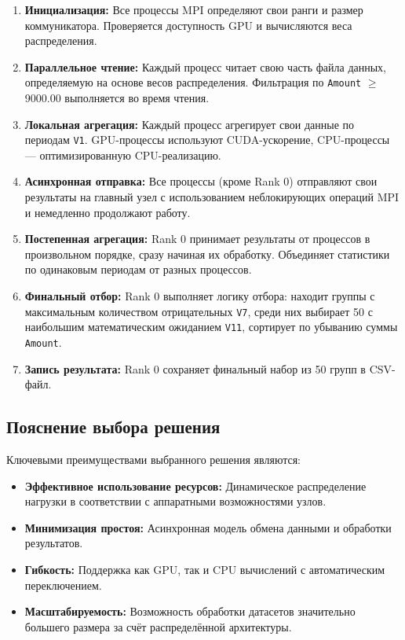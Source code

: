 \documentclass[areaset=advanced]{scrartcl}
\begin{document}
\begin{enumerate}
    \item \textbf{Инициализация:} Все процессы MPI определяют свои ранги и размер коммуникатора. Проверяется доступность GPU и вычисляются веса распределения.
    \item \textbf{Параллельное чтение:} Каждый процесс читает свою часть файла данных, определяемую на основе весов распределения. Фильтрация по \texttt{Amount} $\geq$ 9000.00 выполняется во время чтения.
    \item \textbf{Локальная агрегация:} Каждый процесс агрегирует свои данные по периодам \texttt{V1}. GPU-процессы используют CUDA-ускорение, CPU-процессы — оптимизированную CPU-реализацию.
    \item \textbf{Асинхронная отправка:} Все процессы (кроме Rank 0) отправляют свои результаты на главный узел с использованием неблокирующих операций MPI и немедленно продолжают работу.
    \item \textbf{Постепенная агрегация:} Rank 0 принимает результаты от процессов в произвольном порядке, сразу начиная их обработку. Объединяет статистики по одинаковым периодам от разных процессов.
    \item \textbf{Финальный отбор:} Rank 0 выполняет логику отбора: находит группы с максимальным количеством отрицательных \texttt{V7}, среди них выбирает 50 с наибольшим математическим ожиданием \texttt{V11}, сортирует по убыванию суммы \texttt{Amount}.
    \item \textbf{Запись результата:} Rank 0 сохраняет финальный набор из 50 групп в CSV-файл.
\end{enumerate}

\subsection{Пояснение выбора решения}

Ключевыми преимуществами выбранного решения являются:

\begin{itemize}
    \item \textbf{Эффективное использование ресурсов:} Динамическое распределение нагрузки в соответствии с аппаратными возможностями узлов.
    \item \textbf{Минимизация простоя:} Асинхронная модель обмена данными и обработки результатов.
    \item \textbf{Гибкость:} Поддержка как GPU, так и CPU вычислений с автоматическим переключением.
    \item \textbf{Масштабируемость:} Возможность обработки датасетов значительно большего размера за счёт распределённой архитектуры.
\end{itemize}
\end{document}
